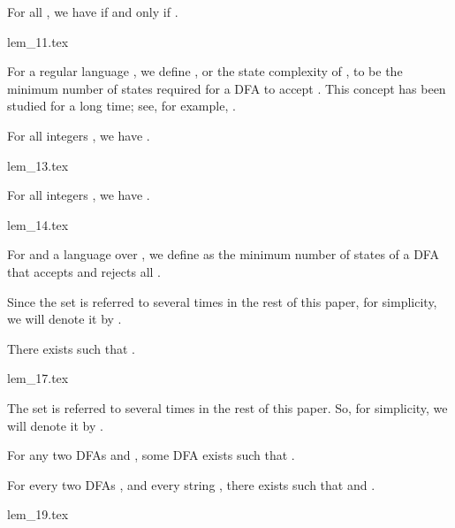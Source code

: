 \documentclass[preprint, 12pt]{elsarticle}
\begin{document}
	\begin{lemma}
		\label{lem:11}
		For all , we have  if and only if .	
	\end{lemma}
	{lem_11.tex}
	
	\begin{definition}
		For a regular language , we define , or the state complexity of , to be the minimum number of states required for a DFA to accept . This concept has been studied for a long time; see, for example, \cite{maslov1970estimates, YuZS92, YuZS94}.
	\end{definition}

	
	\begin{lemma}
		\label{lem:13}
		For all integers , we have .
	\end{lemma}
	{lem_13.tex}
		
	\begin{lemma}
		\label{lem:14}
		For all integers , we have .
	\end{lemma}
	{lem_14.tex}
	

	
	\begin{definition}
		For  and a language  over , we define  as the minimum number of states of a DFA that accepts  and rejects all .
	\end{definition}
	
	\begin{definition}
		Since the set 
		 is referred to several times in the rest of this paper, for simplicity, we will denote it by .
\end{definition}
	
	
	\begin{lemma}
		\label{lem:17}
		There exists  such that .
	\end{lemma}
	{lem_17.tex}
	
	\begin{definition}
		The set 
		 is referred to several times in the rest of this paper. So, for simplicity, we will denote it by .
	\end{definition}
	
	\begin{remark}
		\label{rem:spider}
		For any two DFAs  and , some DFA  exists such that .	
	\end{remark}

	
	\begin{lemma}
		\label{lem:19}
		For every two DFAs , and every string , there exists  such that  and .
	\end{lemma}
	{lem_19.tex}
	
\end{document}
